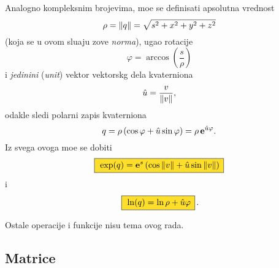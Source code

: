 Analogno kompleksnim brojevima, mo{\zv}e se definisati apsolutna vrednost
$$
\rho = {\Vert q\Vert} = \sqrt{s^2+x^2+y^2+z^2}
$$
(koja se u ovom slu{\cv}aju zove {\sl norma\/}),
ugao rotacije
$$
\varphi = \arccos\left( \frac s\rho \right)
$$
i {\sl jedini{\cv}ni\/} ({\sl unit\/}) vektor vektorskg dela kvaterniona
$$
{\hat u} = \frac v{{\Vert v\Vert}},
$$
odakle sledi polarni zapis kvaterniona
\begin{equation}
    q
=\rho\,(\cos\varphi + {\hat u}\sin\varphi)
=\rho\,{\bf e}^{{\hat u}\varphi}.
\end{equation}
Iz svega ovoga mo{\zv}e se dobiti
\begin{equation}
    \okvir{\exp(q) = \e^s \left( \cos\norm v + \uv\sin\norm v \right)}
\end{equation}
i
\begin{equation}
    \okvir{\ln(q)  = \ln\rho + \uv\varphi}.
\end{equation}

\medskip

Ostale operacije i funkcije nisu tema ovog rada.


\newpage

\subsection{Matrice}

\newpage

